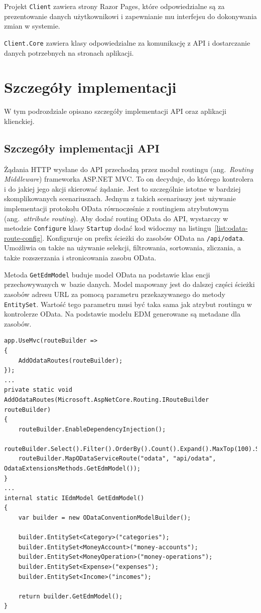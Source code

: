 Projekt \texttt{Client} zawiera strony Razor Pages, które odpowiedzialne są za prezentowanie danych użytkownikowi i zapewnianie mu interfejsu do dokonywania zmian w systemie.

\texttt{Client.Core} zawiera klasy odpowiedzialne za komunikację z API i dostarczanie danych potrzebnych na stronach aplikacji.


\section{Szczegóły implementacji}
\label{sec:szczegoly-implementacji}
W tym podrozdziale opisano szczegóły implementacji API oraz aplikacji klienckiej. 

\subsection{Szczegóły implementacji API}
\label{subsec:szczegoly-implementacji-api}
Żądania HTTP wysłane do API przechodzą przez moduł routingu (ang.~\emph{Routing Middleware}) frameworka ASP.NET MVC. To on decyduje, do którego kontrolera i do jakiej jego akcji skierować żądanie. Jest to szczególnie istotne w bardziej skomplikowanych scenariuszach. Jednym z takich scenariuszy jest używanie implementacji protokołu OData równocześnie z routingiem atrybutowym (ang.~\emph{attribute routing}). Aby dodać routing OData do API, wystarczy w metodzie \texttt{Configure} klasy \texttt{Startup} dodać kod widoczny na listingu~\ref{list:odata-route-config}. Konfiguruje on prefix ścieżki do zasobów OData na \texttt{/api/odata}. Umożliwia on także na używanie selekcji, filtrowania, sortowania, zliczania, a także rozszerzania i stronicowania zasobu OData. 

Metoda \texttt{GetEdmModel} buduje model OData na podstawie klas encji przechowywanych w~bazie danych. Model mapowany jest do dalszej części ścieżki zasobów adresu URL za pomocą parametru przekazywanego do metody \texttt{EntitySet}. Wartość tego parametru musi być taka sama jak atrybut routingu w kontrolerze OData. Na podstawie modelu EDM generowane są metadane dla zasobów. 

{\belowcaptionskip=-10pt
\begin{lstlisting}[label=list:odata-route-config,
    caption=Konfiguracja rouingu OData w aplikacji MVC]
app.UseMvc(routeBuilder =>
{
    AddOdataRoutes(routeBuilder);
});
...
private static void AddOdataRoutes(Microsoft.AspNetCore.Routing.IRouteBuilder routeBuilder)
{
    routeBuilder.EnableDependencyInjection();
    routeBuilder.Select().Filter().OrderBy().Count().Expand().MaxTop(100).SkipToken();
    routeBuilder.MapODataServiceRoute("odata", "api/odata", OdataExtensionsMethods.GetEdmModel());
}
...
internal static IEdmModel GetEdmModel()
{
    var builder = new ODataConventionModelBuilder();

    builder.EntitySet<Category>("categories");
    builder.EntitySet<MoneyAccount>("money-accounts");
    builder.EntitySet<MoneyOperation>("money-operations");
    builder.EntitySet<Expense>("expenses");
    builder.EntitySet<Income>("incomes");

    return builder.GetEdmModel();
}
\end{lstlisting}
}

